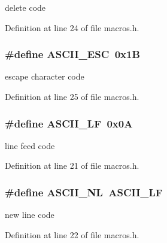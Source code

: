 delete code 



Definition at line 24 of file macros.\+h.

\hypertarget{group__macros_gaf499a0b34ddf61832ae3dab05677ac7b}{}
\subsubsection[{A\+S\+C\+I\+I\+\_\+\+E\+S\+C}]{\setlength{\rightskip}{0pt plus 5cm}\#define A\+S\+C\+I\+I\+\_\+\+E\+S\+C~0x1\+B}\label{group__macros_gaf499a0b34ddf61832ae3dab05677ac7b}


escape character code 



Definition at line 25 of file macros.\+h.

\hypertarget{group__macros_gaca3b498f5936dbe4f3076a47c3e1810d}{}
\subsubsection[{A\+S\+C\+I\+I\+\_\+\+L\+F}]{\setlength{\rightskip}{0pt plus 5cm}\#define A\+S\+C\+I\+I\+\_\+\+L\+F~0x0\+A}\label{group__macros_gaca3b498f5936dbe4f3076a47c3e1810d}


line feed code 



Definition at line 21 of file macros.\+h.

\hypertarget{group__macros_gae8dca46e124869f824f23b0759fda4cb}{}
\subsubsection[{A\+S\+C\+I\+I\+\_\+\+N\+L}]{\setlength{\rightskip}{0pt plus 5cm}\#define A\+S\+C\+I\+I\+\_\+\+N\+L~{\bf A\+S\+C\+I\+I\+\_\+\+L\+F}}\label{group__macros_gae8dca46e124869f824f23b0759fda4cb}


new line code 



Definition at line 22 of file macros.\+h.

\hypertarget{group__macros_ga19a41bff15269d4f73bc19ddd60f9b49}{}
